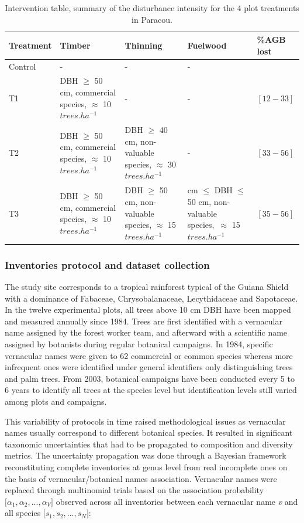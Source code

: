\documentclass[
  11pt,
  french,
  A4paper,
  extrafontsizes,onecolumn,openright
  ]{memoir}
\begin{document}
\begin{longtable}[t]{>{\raggedright\arraybackslash}p{5em}|>{\raggedright\arraybackslash}p{8em}|>{\raggedright\arraybackslash}p{8em}|>{\raggedright\arraybackslash}p{11em}|>{\raggedright\arraybackslash}p{4em}}
\caption{\label{tab:Tab1}Intervention table, summary of the disturbance intensity for the 4 plot treatments in Paracou.}\\
\hline
Treatment & Timber & Thinning & Fuelwood & \%AGB lost\\
\hline
Control & - & - & - & 0\\
\hline
T1 & DBH $\geq$ 50 cm, commercial species, $\approx$ 10   $trees.ha^{-1}$ & - & - & $[12-33]$\\
\hline
T2 & DBH $\geq$ 50 cm, commercial species, $\approx$ 10  $trees.ha^{-1}$ & DBH $\geq$ 40 cm, non-valuable species, $\approx$ 30   $trees.ha^{-1}$ & - & $[33-56]$\\
\hline
T3 & DBH $\geq$ 50 cm, commercial species, $\approx$ 10  $trees.ha^{-1}$ & DBH $\geq$ 50 cm, non-valuable species, $\approx$ 15  $trees.ha^{-1}$ & 40 cm $\leq$ DBH $\leq$ 50 cm, non-valuable species,\ $\approx$ 15 $trees.ha^{-1}$ & $[35-56]$\\
\hline
\end{longtable}

\endgroup{}

\subsubsection{Inventories protocol and dataset
collection}\label{inventories-protocol-and-dataset-collection}

The study site corresponds to a tropical rainforest typical of the
Guiana Shield with a dominance of Fabaceae, Chrysobalanaceae,
Lecythidaceae and Sapotaceae. In the twelve experimental plots, all
trees above 10 cm DBH have been mapped and measured annually since 1984.
Trees are first identified with a vernacular name assigned by the forest
worker team, and afterward with a scientific name assigned by botanists
during regular botanical campaigns. In 1984, specific vernacular names
were given to 62 commercial or common species whereas more infrequent
ones were identified under general identifiers only distinguishing trees
and palm trees. From 2003, botanical campaigns have been conducted every
5 to 6 years to identify all trees at the species level but
identification levels still varied among plots and campaigns.

This variability of protocols in time raised methodological issues as
vernacular names usually correspond to different botanical species. It
resulted in significant taxonomic uncertainties that had to be
propagated to composition and diversity metrics. The uncertainty
propagation was done through a Bayesian framework reconstituting
complete inventories at genus level from real incomplete ones on the
basis of vernacular/botanical names association. Vernacular names were
replaced through multinomial trials based on the association probability
\(\big[\alpha_1, \alpha_2,..., \alpha_V\big]\) observed across all
inventories between each vernacular name \emph{v} and all species
\(\big[s_1, s_2,..., s_N\big]\):
\end{document}
